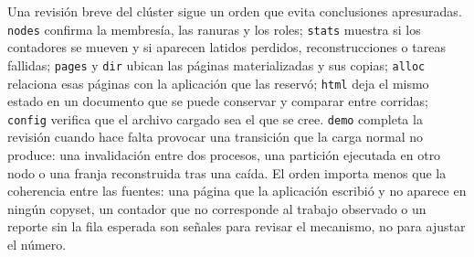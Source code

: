 Una revisión breve del clúster sigue un orden que evita conclusiones apresuradas. \texttt{nodes} confirma la membresía, las ranuras y los roles; \texttt{stats} muestra si los contadores se mueven y si aparecen latidos perdidos, reconstrucciones o tareas fallidas; \texttt{pages} y \texttt{dir} ubican las páginas materializadas y sus copias; \texttt{alloc} relaciona esas páginas con la aplicación que las reservó; \texttt{html} deja el mismo estado en un documento que se puede conservar y comparar entre corridas; \texttt{config} verifica que el archivo cargado sea el que se cree. \texttt{demo} completa la revisión cuando hace falta provocar una transición que la carga normal no produce: una invalidación entre dos procesos, una partición ejecutada en otro nodo o una franja reconstruida tras una caída. El orden importa menos que la coherencia entre las fuentes: una página que la aplicación escribió y no aparece en ningún copyset, un contador que no corresponde al trabajo observado o un reporte sin la fila esperada son señales para revisar el mecanismo, no para ajustar el número.
